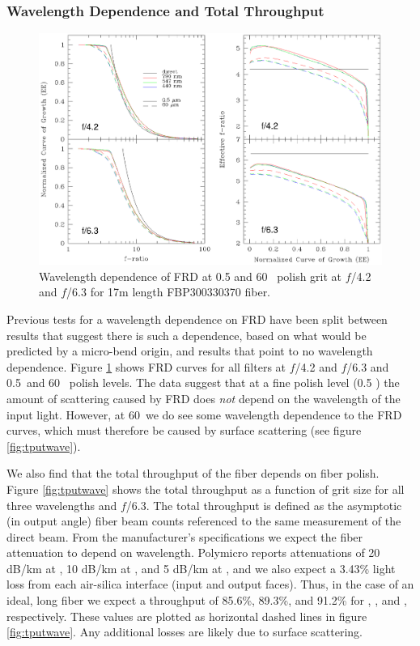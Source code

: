 \subsubsection{Wavelength Dependence and Total Throughput}
\label{FRD:sec:wavelength}
\begin{figure}[ht]
  \centering
  \includegraphics[width=\textwidth, trim=0 2.6in 0 0, clip=true]{FRD/figs/filters.eps}
  \caption{\fixspacing\label{fig:wave} Wavelength dependence of FRD at 0.5 and 60
   \mum\ polish grit at $f$/4.2 and $f$/6.3 for 17m length
    FBP300330370 fiber.}
\end{figure}

Previous tests for a wavelength dependence on FRD have been split
between results that suggest there is such a
dependence\cite{Carrasco,Gloge72}, based on what would be predicted by
a micro-bend origin, and results that point to no wavelength
dependence\cite{Mab_04, Schmoll_03}. Figure \ref{fig:wave} shows FRD
curves for all filters at $f$/4.2 and $f$/6.3 and 0.5\mum\ and 60
\mum\ polish levels. The data suggest that at a fine polish level (0.5
\mum) the amount of scattering caused by FRD does {\it not} depend on
the wavelength of the input light. However, at 60\mum\ we do see some
wavelength dependence to the FRD curves, which  must therefore be
caused by surface scattering (see figure \ref{fig:tputwave}).

We also find that the total throughput of the fiber depends on
fiber polish. Figure \ref{fig:tputwave} shows the
total throughput as a function of grit size for all three wavelengths
and $f$/6.3. The total throughput is defined as the asymptotic (in output
 angle) fiber beam counts referenced to the same measurement of the direct
 beam. From the manufacturer's specifications
we expect the fiber attenuation to depend on wavelength. Polymicro
reports attenuations of 20 dB/km at \filtB, 10 dB/km at \filty, and 5
dB/km at \filtI, and we also expect a 3.43\% light loss from each
air-silica interface (input and output faces). Thus, in the case of an
ideal,  long fiber we expect a throughput of 85.6\%,
89.3\%, and 91.2\% for \filtB, \filty, and \filtI, respectively. These
values are plotted as horizontal dashed lines in figure
\ref{fig:tputwave}. Any additional losses are likely due to surface
scattering.

